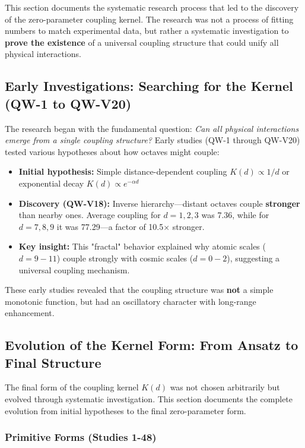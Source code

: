 \documentclass[11pt, a4paper]{article}
\begin{document}
This section documents the systematic research process that led to the discovery of the zero-parameter coupling kernel. The research was not a process of fitting numbers to match experimental data, but rather a systematic investigation to \textbf{prove the existence} of a universal coupling structure that could unify all physical interactions.

\subsection{Early Investigations: Searching for the Kernel (QW-1 to QW-V20)}

The research began with the fundamental question: \textit{Can all physical interactions emerge from a single coupling structure?} Early studies (QW-1 through QW-V20) tested various hypotheses about how octaves might couple:

\begin{itemize}
    \item \textbf{Initial hypothesis:} Simple distance-dependent coupling $K(d) \propto 1/d$ or exponential decay $K(d) \propto e^{-\alpha d}$
    \item \textbf{Discovery (QW-V18):} Inverse hierarchy—distant octaves couple \textbf{stronger} than nearby ones. Average coupling for $d=1,2,3$ was 7.36, while for $d=7,8,9$ it was 77.29—a factor of 10.5$\times$ stronger.
    \item \textbf{Key insight:} This "fractal" behavior explained why atomic scales ($d=9-11$) couple strongly with cosmic scales ($d=0-2$), suggesting a universal coupling mechanism.
\end{itemize}

These early studies revealed that the coupling structure was \textbf{not} a simple monotonic function, but had an oscillatory character with long-range enhancement.

\subsection{Evolution of the Kernel Form: From Ansatz to Final Structure}

The final form of the coupling kernel $K(d)$ was not chosen arbitrarily but evolved through systematic investigation. This section documents the complete evolution from initial hypotheses to the final zero-parameter form.

\subsubsection{Primitive Forms (Studies 1-48)}
\end{document}
